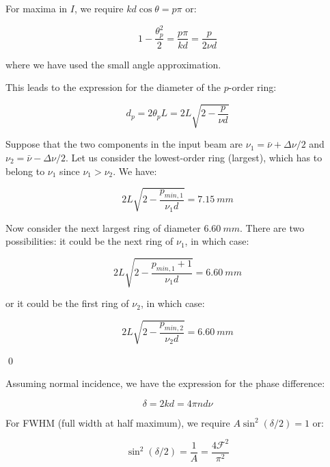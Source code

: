 \documentclass[12pt]{article}
\begin{document}
For maxima in $I$, we require $kd \cos{\theta} = p \pi$ or:

\begin{equation}
    1 - \frac{\theta_{p}^{2}}{2} = \frac{p \pi}{kd} = \frac{p}{2\nu d}
\end{equation}

where we have used the small angle approximation.

This leads to the expression for the diameter of the $p$-order ring:

\begin{equation}
    d_{p} = 2\theta_{p} L = 2L \sqrt{2 - \frac{p}{\nu d}}
\end{equation}

Suppose that the two components in the input beam are $\nu_{1} = \bar{\nu} + \Delta \nu/2$ and $\nu_{2} = \bar{\nu} - \Delta \nu/2$. Let us consider the lowest-order ring (largest), which has to belong to $\nu_{1}$ since $\nu_{1} > \nu_{2}$. We have:

\begin{equation}
    2L \sqrt{2 - \frac{p_{min, 1}}{\nu_{1} d}} = \qty{7.15}{mm}
\end{equation}

Now consider the next largest ring of diameter $\qty{6.60}{mm}$. There are two possibilities: it could be the next ring of $\nu_{1}$, in which case:

\begin{equation}
    2L \sqrt{2 - \frac{p_{min, 1} + 1}{\nu_{1} d}} = \qty{6.60}{mm}
\end{equation}

or it could be the first ring of $\nu_{2}$, in which case:

\begin{equation}
    2L \sqrt{2 - \frac{p_{min, 2}}{\nu_{2} d}} = \qty{6.60}{mm}
\end{equation}


\qed


Assuming normal incidence, we have the expression for the phase difference:

\begin{equation}
    \delta = 2kd = 4\pi n d \nu
\end{equation}

For FWHM (full width at half maximum), we require $A \sin^{2}{(\delta/2)} = 1$ or:

\begin{equation}
    \sin^{2}{(\delta/2)} = \frac{1}{A} = \frac{4 \mathcal{F}^{2}}{\pi^{2}}
\end{equation}
\end{document}
